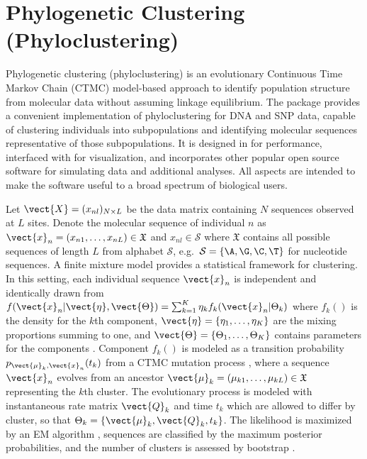 \section[Phylogenetic Clustering (Phyloclustering)]{Phylogenetic Clustering (Phyloclustering)}
\label{sec:phyloclustering}

Phylogenetic clustering (phyloclustering) is an evolutionary
Continuous Time Markov Chain (CTMC) model-based approach to identify population
structure from molecular data without assuming linkage equilibrium.
The  package provides a convenient implementation of
phyloclustering for DNA and SNP data, capable of clustering individuals into
subpopulations and identifying molecular sequences representative
of those subpopulations.
It is designed in  for performance,
interfaced with  for visualization,
and incorporates other popular open source software for
simulating data and additional analyses.
All aspects are intended to make the software useful to a broad
spectrum of biological users.

Let $\vect{X} = (x_{nl})_{N\times L}$ be the data matrix containing
$N$ sequences observed at $L$ sites. Denote the molecular sequence
of individual $n$ as
$\vect{x}_n = (x_{n1}, \ldots, x_{nL}) \in \mathfrak{X}$ and
$x_{nl} \in \mathcal{S}$ where
$\mathfrak{X}$ contains all possible sequences of length $L$ from alphabet
$\mathcal{S}$, e.g.\ $\mathcal{S} = \{\A, \G, \C, \T\}$
for nucleotide sequences.
A finite mixture model provides a statistical framework for clustering.
In this setting, each individual sequence $\vect{x}_n$ is independent
and identically drawn from
$
f(\vect{x}_n | \vect{\eta}, \vect{\Theta}) =
\sum_{k = 1}^K \eta_k f_k(\vect{x}_n | \Theta_k)
$
where $f_k()$ is the density for the $k$th component,
$\vect{\eta} = \{\eta_1, \ldots, \eta_K\}$ are the mixing proportions
summing to one, and
$\vect{\Theta} = \{\Theta_1,\ldots,\Theta_K\}$ contains parameters for the
components \citep{Fraley2002}.
Component $f_k()$ is modeled as a transition probability
$p_{\vect{\mu}_k,\vect{x}_n}(t_k)$ from a CTMC mutation
process \citep{Felsenstein2004}, where
a sequence $\vect{x}_n$ evolves from
an ancestor
$\vect{\mu}_k = (\mu_{k1}, \ldots, \mu_{kL}) \in \mathfrak{X}$
representing the $k$th cluster.
The evolutionary process is modeled with instantaneous rate matrix
$\vect{Q}_k$ and time $t_k$
which are allowed to differ by cluster, so that
$\Theta_k = \{\vect{\mu}_k, \vect{Q}_k, t_k\}$.
The likelihood is maximized by an EM algorithm \citep{Dempster1977},
sequences are classified
by the maximum posterior probabilities, and the number of clusters is
assessed by bootstrap \citep{Maitra2010}.

